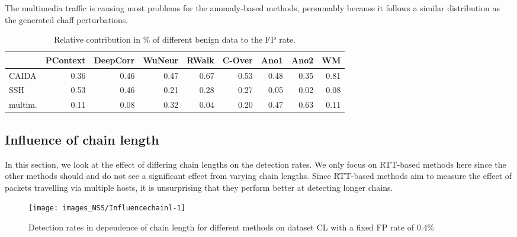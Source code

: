 The multimedia traffic is causing most problems for the anomaly-based methods, persumably because it follows a similar distribution as the generated chaff perturbations.
\begin{table}
\small
\centering
\begin{tabular}{l|r|r|r|r|r|r|r|r}
  \hline
 & PContext & DeepCorr & WuNeur & RWalk & C-Over & Ano1 & Ano2 & WM \\ 
  \hline
CAIDA & 0.36 & 0.46 & 0.47 & 0.67 & 0.53 & 0.48 & 0.35 & 0.81 \\ 
  SSH & 0.53 & 0.46 & 0.21 & 0.28 & 0.27 & 0.05 & 0.02 & 0.08 \\ 
  multim. & 0.11 & 0.08 & 0.32 & 0.04 & 0.20 & 0.47 & 0.63 & 0.11 \\ 
   \hline
\end{tabular}

\caption{Relative contribution in \% of different benign data to the FP rate.}\label{tabN:dfFP}
\end{table}



\subsection{Influence of chain length}\label{SecN:Chainl}

In this section, we look at the effect of differing chain lengths on the detection rates. We only focus on RTT-based methods here since the other methods should and do not see a significant effect from varying chain lengths. %
Since RTT-based methods aim to measure the effect of packets travelling via multiple hosts, it is unsurprising that they perform better at detecting longer chains. 

\begin{figure}
\texttt{[image: images\_NSS/Influencechainl-1]} \caption[Detection rates in dependence of chain length for different methods on dataset CL with a fixed FP rate of $0.4\%$]{Detection rates in dependence of chain length for different methods on dataset CL with a fixed FP rate of $0.4\%$}\label{figN:Influencechainl}
\end{figure}

